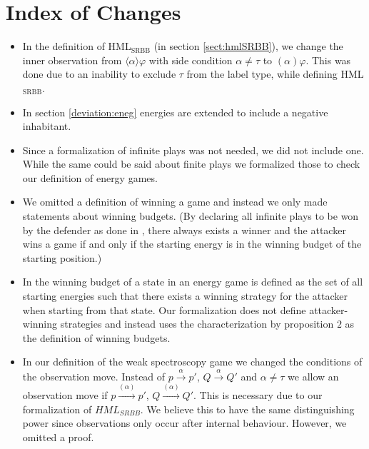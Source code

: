 \section{Index of Changes}
\begin{itemize}
    \item In the definition of HML$_\text{SRBB}$ (in section \ref{sect:hmlSRBB}), we change the inner observation from
    $\langle\alpha\rangle\varphi$ with side condition $\alpha \neq \tau$ to $(\alpha)\varphi$.
    This was done due to an inability to exclude $\tau$ from the label type, while defining HML$_\text{SRBB}$. 
    
    \item In section \ref{deviation:eneg} energies are extended to include a negative inhabitant. 
    
    \item Since a formalization of infinite plays was not needed, we did not include one. While the 
    same could be said about finite plays we formalized those to check our definition of energy games.
    
    \item We omitted a definition of winning a game and instead we only made statements about winning budgets. 
    (By declaring all infinite plays to be won by the defender as done in \cite{bisping2023lineartimebranchingtime}, 
    there always exists a winner and the attacker wins a game if and only if the starting energy is in the winning budget of the starting position.)
    
    \item In \cite{bisping2023lineartimebranchingtime} the winning budget of a state in an energy game 
    is defined as the set of all starting energies such that there exists a winning strategy for the attacker 
    when starting from that state. Our formalization does not define attacker-winning strategies and instead 
    uses the characterization by proposition $2$ \cite[p. 9]{bisping2023lineartimebranchingtime} as the definition of winning budgets.
    
    \item In our definition of the weak spectroscopy game we changed the conditions of the observation move. 
    Instead of $p \overset{\alpha}{\longrightarrow}p'$, $Q \overset{\alpha}{\longrightarrow} Q'$ and $\alpha \neq \tau$
    we allow an observation move if  $p \overset{(\alpha)}{\longrightarrow}p'$, $Q \overset{(\alpha)}{\longrightarrow} Q'$.
    This is necessary due to our formalization of $HML_{SRBB}$. We believe this to have the same distinguishing power 
    since observations only occur after internal behaviour. However, we omitted a proof. 
    

\end{itemize}
